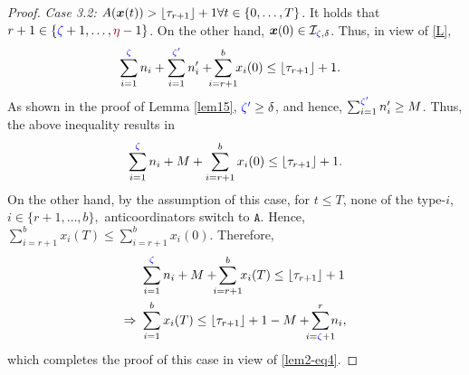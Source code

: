 \documentclass[10 pt,twocolumn,journal]{IEEEtran}
\DeclarePairedDelimiter{\floor}{\lfloor}{\rfloor}
\theoremstyle{plain}
\newcommand{\A}{\mathcal{A}}
\newcommand{\I}{\mathcal{I}}
\newcommand{\x}{\bm{x}}
\renewcommand{\r}{\tb{\zeta}}
\newcommand{\rr}{\tb{\zeta'}}
\newcommand{\s}{\tr{\eta}}
\renewcommand{\d}{{\delta}}
\renewcommand{\A}{\mathtt{A}}
\newcommand{\tb}{\textcolor{blue}}
\newcommand{\tr}{\textcolor{Myred}}
\theoremstyle{definition}
\begin{document}
\begin{proof}
    \emph{Case 3.2:} $A(\x(t)) > \floor{\tau_{r+1}} + 1 \forall t\in\{0,\ldots,T\}$.
    It holds that $r+1\in\{\r+1,\ldots,\s-1\}$.
    On the other hand, $\x(0)\in\I_{\r,\d}$.
    Thus, in view of \eqref{L},
     \begin{align*}
        &\sum_{i = 1}^{\r} n_i + \sum_{i=1}^{\rr}n'_i +\!\!\! \sum_{i=r+1}^{b}\!\! x_i(0)
        \leq \floor{\tau_{r+1}} + 1.  
    \end{align*}
    As shown in the proof of Lemma \ref{lem15}, $\rr\geq \d$, and hence, $\sum_{i=1}^{\rr}n'_i \geq M$.
    Thus, the above inequality results in
    \begin{align*}
         \sum_{i = 1}^{\r} n_i + M + \sum_{i=r+1}^{b} x_i(0)
        \leq \floor{\tau_{r+1}}+1.
    \end{align*} 
    On the other hand, by the assumption of this case, for $t\leq T$, none of the type-$i$, $i\in\{r+1, \ldots, b\},$ anticoordinators switch to $\A$. 
    Hence, $\sum_{i=r+1}^{b} x_i(T) \leq \sum_{i=r+1}^{b} x_i(0)$.
    Therefore, 
    \begin{align*}
        &\sum_{i = 1}^{\r} n_i + M + \!\!\! \sum_{i=r+1}^{b}\!\! x_i(T)
        \leq \floor{\tau_{r+1}} + 1 \nonumber\\
        \Rightarrow\ 
        & \sum_{i = 1}^{b} x_i(T) 
        \leq \floor{\tau_{r+1}}+1 -M + \!\!\!\sum_{i=\r+1}^r\!\!\! n_i, 
    \end{align*}    
    which completes the proof of this case in view of \eqref{lem2-eq4}.
\end{proof}
\end{document}
